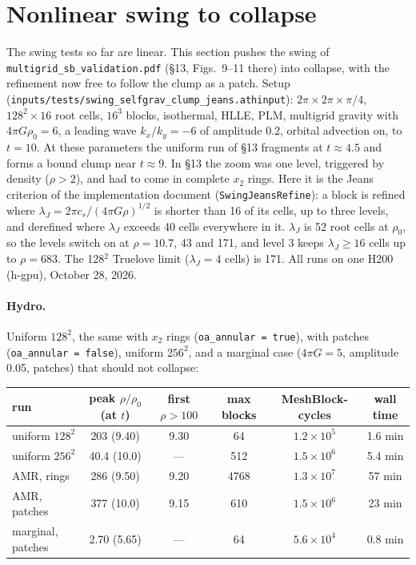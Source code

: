 \documentclass[11pt]{article}
\newcommand{\code}[1]{\texttt{#1}}
\newcommand{\file}[1]{\texttt{\small #1}}
\newcommand{\fn}[1]{\texttt{\small #1}}
\begin{document}
\section{Nonlinear swing to collapse}
\label{sec:clump}
The swing tests so far are linear. This section pushes the swing of
\file{multigrid\_sb\_validation.pdf} (\S13, Figs.~9--11 there) into collapse, with the
refinement now free to follow the clump as a patch. Setup
(\file{inputs/tests/swing\_selfgrav\_clump\_jeans.athinput}): $2\pi\times2\pi\times\pi/4$,
$128^2\times16$ root cells, $16^3$ blocks, isothermal, HLLE, PLM, multigrid gravity with
$4\pi G\rho_0 = 6$, a leading wave $k_x/k_y = -6$ of amplitude $0.2$, orbital advection on,
to $t = 10$. At these parameters the uniform run of \S13 fragments at $t \approx 4.5$ and
forms a bound clump near $t \approx 9$. In \S13 the zoom was one level, triggered by density
($\rho > 2$), and had to come in complete $x_2$ rings. Here it is the Jeans criterion of the
implementation document (\fn{SwingJeansRefine}): a block is refined where
$\lambda_J = 2\pi c_s/(4\pi G\rho)^{1/2}$ is shorter than 16 of its cells, up to three
levels, and derefined where $\lambda_J$ exceeds 40 cells everywhere in it. $\lambda_J$ is
52 root cells at $\rho_0$, so the levels switch on at $\rho = 10.7$, 43 and 171, and level 3
keeps $\lambda_J \geq 16$ cells up to $\rho = 683$. The 128$^2$ Truelove limit ($\lambda_J
= 4$ cells) is 171. All runs on one H200 (h-gpu), October 28, 2026.

\paragraph{Hydro.} Uniform $128^2$, the same with $x_2$ rings (\code{oa\_annular = true}),
with patches (\code{oa\_annular = false}), uniform $256^2$, and a marginal case
($4\pi G = 5$, amplitude 0.05, patches) that should not collapse:

\begin{center}
\small
\begin{tabular}{@{}lccccc@{}}
\toprule
run & peak $\rho/\rho_0$ (at $t$) & first $\rho > 100$ & max blocks & MeshBlock-cycles & wall time \\
\midrule
uniform $128^2$            & 203 (9.40) & 9.30 & 64      & $1.2\times10^5$ & 1.6 min \\
uniform $256^2$            & 40.4 (10.0) & ---  & 512     & $1.5\times10^6$ & 5.4 min \\
AMR, rings                 & 286 (9.50) & 9.20 & 4768    & $1.3\times10^7$ & 57 min \\
AMR, patches               & 377 (10.0) & 9.15 & 610     & $1.5\times10^6$ & 23 min \\
marginal, patches          & 2.70 (5.65) & ---  & 64      & $5.6\times10^4$ & 0.8 min \\
\bottomrule
\end{tabular}
\end{center}
\end{document}
